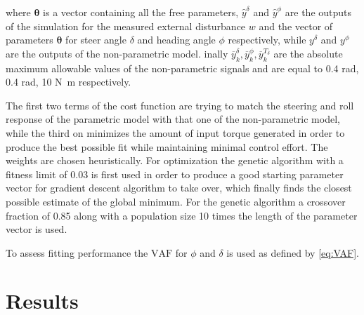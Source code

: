  
where \ensuremath{\boldsymbol{\theta}} is a vector containing all the free parameters, \ensuremath{\hat{y}^{\delta}} and \ensuremath{\hat{y}^{\phi}} are the outputs of the simulation for the measured external disturbance \ensuremath{w} and the vector of parameters  \ensuremath{\boldsymbol{\theta}} for steer angle \ensuremath{\delta} and heading angle \ensuremath{\phi}  respectively, while \ensuremath{y^\delta} and \ensuremath{y^\phi} are the outputs of the non-parametric model. inally \ensuremath{\overline{y}^{\delta}_k,\overline{y}^{\phi}_k,\overline{y}^{T_\delta}_k} are the absolute maximum allowable values of the non-parametric signals and are equal to 0.4 \si{\radian}, 0.4 \si{\radian}, 10 \si{N.m} respectively.
 
The first two terms  of the cost function are trying to match the steering and roll  response of the parametric model with that one of the non-parametric model, while the third on minimizes the amount of input torque generated in order to produce the best possible fit while maintaining minimal control effort. The weights are chosen heuristically. For optimization the genetic algorithm with a fitness limit of 0.03 is first  used in order to produce a good starting parameter vector for gradient descent algorithm to take over, which finally finds the closest possible estimate of the global minimum. For the genetic algorithm a crossover fraction of 0.85  along with a population size 10 times the length of the parameter vector is used. 
 
To assess fitting performance the \ensuremath{\mathrm{VAF}} for \ensuremath{\phi} and \ensuremath{\delta} is used as defined by \cref{eq:VAF}.
\section{Results}
